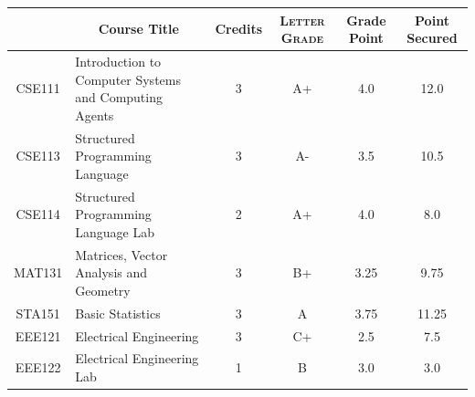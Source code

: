 \documentclass[11pt]{article}
\newcommand*{\numtwo}[1]{\pgfmathprintnumber[
                    fixed, precision=2, fixed zerofill=true]{#1}}
\begin{document}
                \begin{center}
                    \renewcommand{\arraystretch}{1.08}
                    
                \begin{tabular}{|c|l|c|>{\scshape}c|c|c|}
                \hline  \rule[-1ex]{0pt}{3.5ex} {\centering{\bf Course Code}} &  \multicolumn{1}{c|}{\textbf{Course Title}}  & {\bf Credits} & {\bf Letter Grade} & {\bf Grade Point} & {\bf Point Secured}  \\ 
                \hline   CSE111 &  Introduction to Computer Systems and Computing Agents		 & 3 & A+ & 4.0 & 12.0 \\ %
                \hline   CSE113 &  Structured Programming Language		 & 3 & A- & 3.5 & 10.5 \\ %
                \hline   CSE114 &  Structured Programming Language Lab		 & 2 & A+ & 4.0 & 8.0 \\ %
                \hline   MAT131 &  Matrices, Vector Analysis and Geometry		 & 3 & B+ & 3.25 & 9.75 \\ %
                \hline   STA151 &  Basic Statistics		 & 3 & A & 3.75 & 11.25 \\ %
                \hline   EEE121 &  Electrical Engineering		 & 3 & C+ & 2.5 & 7.5 \\ %
                \hline   EEE122 &  Electrical Engineering Lab		 & 1 & B & 3.0 & 3.0 \\ %

\hline                %
                \end{tabular}
                \end{center}
                \renewcommand{\arraystretch}{1.03}
\end{document}
